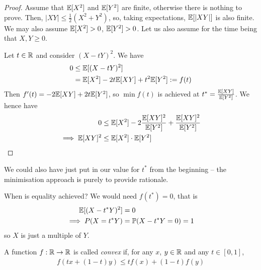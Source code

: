 \documentclass{../../template/note}
\begin{document}
    \begin{proof}
        Assume that \(\mathbb E[X^2]\) and \(\mathbb E[Y^2]\) are finite, otherwise there is nothing to prove. Then, \(|XY| \leq \frac 1 2 (X^2 + Y^2)\), so, taking expectations, \(\mathbb E[|XY|]\) is also finite. We may also assume \(\mathbb E[X^2] > 0\), \(\mathbb E[Y^2] > 0\). Let us also assume for the time being that \(X, Y \geq 0\).

        Let \(t \in \mathbb R\) and consider \((X-tY)^2\). We have
        \begin{align*}
            0 &\leq \mathbb E[(X-tY)^2] \\
            &= \mathbb E[X^2] - 2t\mathbb E[XY] + t^2\mathbb E[Y^2] := f(t)
        \end{align*}
        Then \(f'(t) = -2\mathbb E[XY] + 2t\mathbb E[Y^2]\), so \(\min f(t)\) is achieved at \(t^* = \frac{\mathbb E[XY]}{\mathbb E[Y^2]}\). We hence have
        \begin{align*}
            0 &\leq \mathbb E[X^2] - 2\frac{\mathbb E[XY]^2}{\mathbb E[Y^2]} + \frac{\mathbb E[XY]^2}{\mathbb E[Y^2]} \\
            \implies \mathbb E[XY]^2 &\leq \mathbb E[X^2] \cdot \mathbb E[Y^2]
        \end{align*}
    \end{proof}
    
    \begin{remark*}
        We could also have just put in our value for \(t^*\) from the beginning -- the minimisation approach is purely to provide rationale.
    \end{remark*}
    
    \begin{remark*}
        When is equality achieved? We would need \(f(t^*) = 0\), that is
        \begin{align*}
            \mathbb E[(X - t^*Y)^2] &= 0 \\
            \implies P(X = t^*Y) &= \mathbb P(X - t^*Y = 0) = 1
        \end{align*}
        so \(X\) is just a multiple of \(Y\).        
    \end{remark*}
    
    \begin{definition}[Convexity]
        A function \(f: \mathbb R \to \mathbb R\) is called \emph{convex} if, for any \(x\), \(y \in \mathbb R\) and any \(t \in [0, 1]\),
        \begin{align*}
            f(tx + (1-t)y) \leq tf(x) + (1-t)f(y)
        \end{align*}
    \end{definition}
    
\end{document}
